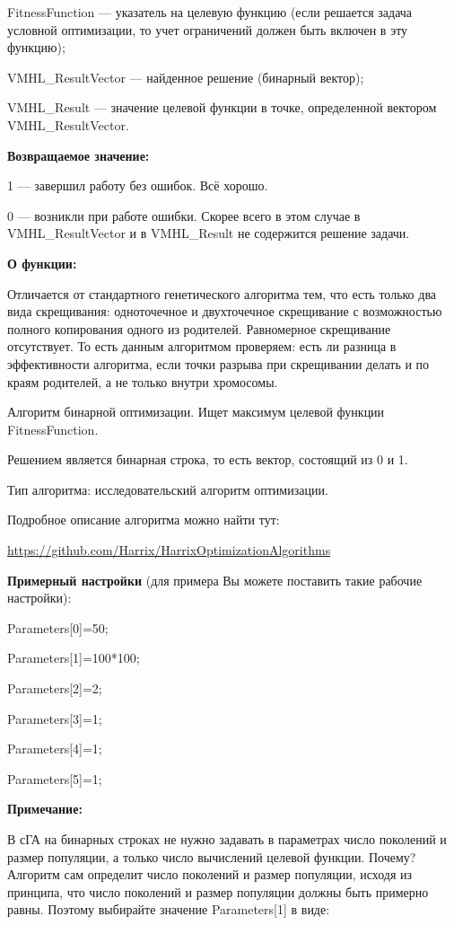 \documentclass[a4paper,12pt]{article}
\begin{document}
FitnessFunction --- указатель на целевую функцию (если решается задача условной оптимизации, то учет ограничений должен быть включен в эту функцию);
 
VMHL\_ResultVector --- найденное решение (бинарный вектор);
 
VMHL\_Result --- значение целевой функции в точке, определенной вектором VMHL\_ResultVector.

\textbf{Возвращаемое значение:} 

 1 --- завершил работу без ошибок. Всё хорошо.
 
 0 --- возникли при работе ошибки. Скорее всего в этом случае в VMHL\_ResultVector и в VMHL\_Result не содержится решение задачи.

\textbf{О функции:}

Отличается от стандартного генетического алгоритма тем, что есть только два вида скрещивания: одноточечное и двухточечное скрещивание с возможностью полного копирования одного из родителей. Равномерное скрещивание отсутствует. То есть данным алгоритмом проверяем: есть ли разница в эффективности алгоритма, если точки разрыва при скрещивании делать и по краям родителей, а не только внутри хромосомы.

Алгоритм бинарной оптимизации. Ищет максимум целевой функции FitnessFunction.

Решением является бинарная строка, то есть вектор, состоящий из 0 и 1.

Тип алгоритма: исследовательский алгоритм оптимизации.

Подробное описание алгоритма можно найти тут:

\href{https://github.com/Harrix/HarrixOptimizationAlgorithms/blob/master/\_HarrixOptimizationAlgorithms.pdf}{https://github.com/Harrix/HarrixOptimizationAlgorithms}


\textbf{Примерный настройки} (для примера Вы можете поставить такие рабочие настройки):

 Parameters[0]=50;
 
Parameters[1]=100*100;

Parameters[2]=2;

Parameters[3]=1;

Parameters[4]=1;

Parameters[5]=1;


\textbf{Примечание:}

 В сГА на бинарных строках не нужно задавать в параметрах число поколений и размер популяции, а только число вычислений целевой функции. Почему? Алгоритм сам определит число поколений и размер популяции, исходя из принципа, что число поколений и размер популяции должны быть примерно равны. Поэтому выбирайте значение Parameters[1] в виде:
\end{document}
